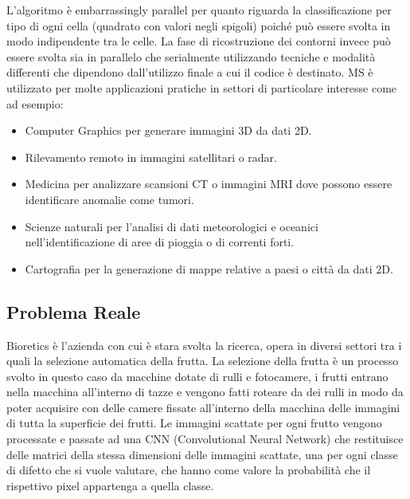 \documentclass[12pt,a4paper]{report}
\begin{document}
L'algoritmo è embarrassingly parallel per quanto riguarda la classificazione per tipo di ogni cella (quadrato con valori negli spigoli) poiché può essere svolta in modo indipendente tra le celle. \newline
La fase di ricostruzione dei contorni invece può essere svolta sia in parallelo che serialmente utilizzando tecniche e modalità differenti che dipendono dall'utilizzo finale a cui il codice è destinato. \newline
MS è utilizzato per molte applicazioni pratiche in settori di particolare interesse come ad esempio:
\begin{itemize}
\item Computer Graphics per generare immagini 3D da dati 2D.
\item Rilevamento remoto in immagini satellitari o radar.
\item Medicina per analizzare scansioni CT o immagini MRI dove possono essere identificare anomalie come tumori.
\item Scienze naturali per l'analisi di dati meteorologici e oceanici nell'identificazione di aree di pioggia o di correnti forti.
\item Cartografia per la generazione di mappe relative a paesi o città da dati 2D.
\end{itemize}

\subsection{Problema Reale}
Bioretics è l'azienda con cui è stara svolta la ricerca, opera in diversi settori tra i quali la selezione automatica della frutta. La selezione della frutta è un processo svolto in questo caso da macchine dotate di rulli e fotocamere, i frutti entrano nella macchina all'interno di tazze e vengono fatti roteare da dei rulli in modo da poter acquisire con delle camere fissate all'interno della macchina delle immagini di tutta la superficie dei frutti. Le immagini scattate per ogni frutto vengono processate e passate ad una CNN (Convolutional Neural Network) che restituisce delle matrici della stessa dimensioni delle immagini scattate, una per ogni classe di difetto che si vuole valutare, che hanno come valore la probabilità che il rispettivo pixel appartenga a quella classe. \newline
\end{document}
